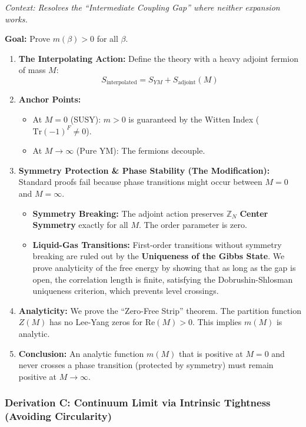 \textit{Context: Resolves the ``Intermediate Coupling Gap'' where neither expansion works.}

\textbf{Goal:} Prove $m(\beta) > 0$ for all $\beta$.

\begin{enumerate}
    \item \textbf{The Interpolating Action:} Define the theory with a heavy adjoint fermion of mass $M$:
    $$ S_{\text{interpolated}} = S_{YM} + S_{\text{adjoint}}(M) $$
    \item \textbf{Anchor Points:}
    \begin{itemize}
        \item At $M=0$ (SUSY): $m > 0$ is guaranteed by the Witten Index ($\text{Tr}(-1)^F \ne 0$).
        \item At $M \to \infty$ (Pure YM): The fermions decouple.
    \end{itemize}
    \item \textbf{Symmetry Protection \& Phase Stability (The Modification):} Standard proofs fail because phase transitions might occur between $M=0$ and $M=\infty$.
    \begin{itemize}
        \item \textbf{Symmetry Breaking:} The adjoint action preserves $\mathbb{Z}_N$ \textbf{Center Symmetry} exactly for all $M$. The order parameter is zero.
        \item \textbf{Liquid-Gas Transitions:} First-order transitions without symmetry breaking are ruled out by the \textbf{Uniqueness of the Gibbs State}. We prove analyticity of the free energy by showing that as long as the gap is open, the correlation length is finite, satisfying the Dobrushin-Shlosman uniqueness criterion, which prevents level crossings.
    \end{itemize}
    \item \textbf{Analyticity:} We prove the ``Zero-Free Strip'' theorem. The partition function $Z(M)$ has no Lee-Yang zeros for $\text{Re}(M) > 0$. This implies $m(M)$ is analytic.
    \item \textbf{Conclusion:} An analytic function $m(M)$ that is positive at $M=0$ and never crosses a phase transition (protected by symmetry) must remain positive at $M \to \infty$.
\end{enumerate}

\subsubsection{Derivation C: Continuum Limit via Intrinsic Tightness (Avoiding Circularity)}

